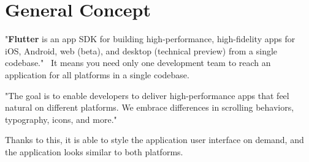 \section{General Concept}\label{sec:general-concept}
"\textbf{Flutter} is an app SDK for building high-performance, high-fidelity apps for iOS, Android, web (beta), and desktop (technical preview) from a single codebase."~\cite{flutterTechnicalOverview}
It means you need only one development team to reach an application for all platforms in a single codebase.

"The goal is to enable developers to deliver high-performance apps that feel natural on different platforms.
We embrace differences in scrolling behaviors, typography, icons, and more."~\cite{flutterTechnicalOverview}

Thanks to this, it is able to style the application user interface on demand, and the application looks similar to both platforms.
